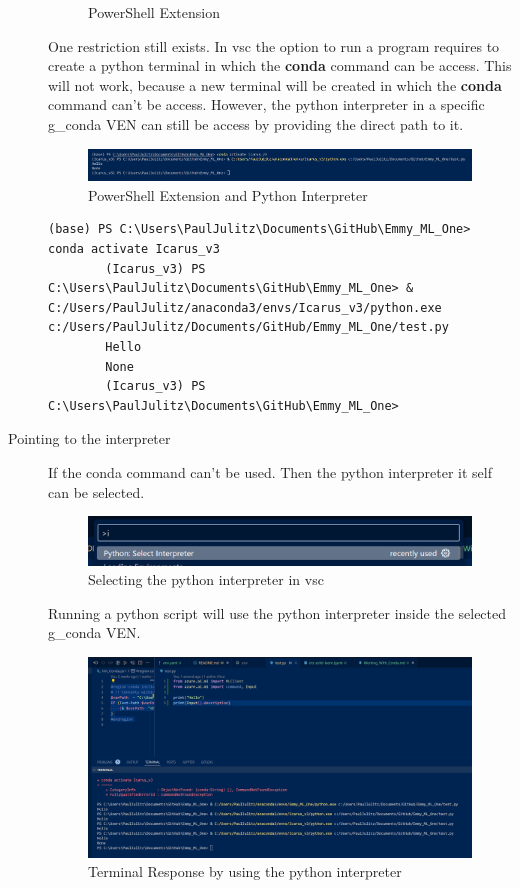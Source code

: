 \begin{description}
\begin{figure}[H]
		\caption{PowerShell Extension}
	\end{figure}
	One restriction still exists. In \gls{vsc} the option to run a program requires to create a python terminal in which the \textbf{conda} command can be access. This will not work, because a new terminal will be created in which the \textbf{conda} command can't be access. However, the python interpreter in a specific \gls{g_conda} \gls{VEN} can still be access by providing the direct path to it.
	\begin{figure}[H]
		\centering
		\includegraphics[scale = 0.4]{attachment/chapter_AML/Scc027}
		\caption{PowerShell Extension and Python Interpreter}
	\end{figure}
	\begin{lstlisting}[language=iCMD, caption={Commands}, captionpos=b]
		(base) PS C:\Users\PaulJulitz\Documents\GitHub\Emmy_ML_One> conda activate Icarus_v3
		(Icarus_v3) PS C:\Users\PaulJulitz\Documents\GitHub\Emmy_ML_One> & C:/Users/PaulJulitz/anaconda3/envs/Icarus_v3/python.exe c:/Users/PaulJulitz/Documents/GitHub/Emmy_ML_One/test.py  
		Hello
		None
		(Icarus_v3) PS C:\Users\PaulJulitz\Documents\GitHub\Emmy_ML_One>
	\end{lstlisting}
	\item[Pointing to the interpreter] If the conda command can't be used.
	Then the python interpreter it self can be selected.
	\begin{figure}[H]
		\centering
		\includegraphics[scale = 0.4]{attachment/chapter_AML/Scc025}
		\caption{Selecting the python interpreter in \gls{vsc}}
	\end{figure}
	Running a python script will use the python interpreter inside the selected \gls{g_conda} \gls{VEN}.
	\begin{figure}[H]
		\centering
		\includegraphics[scale = 0.2]{attachment/chapter_AML/Scc024}
		\caption{Terminal Response by using the python interpreter}
	\end{figure}
\end{description}

